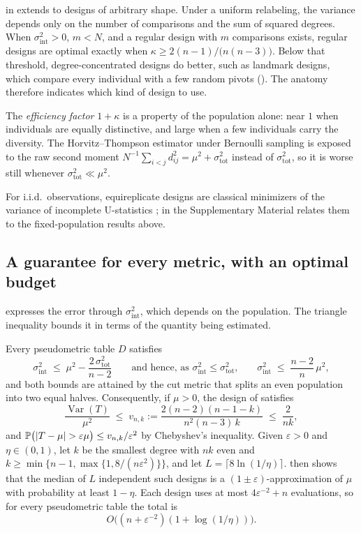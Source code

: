 \documentclass[twoside,11pt]{article}
\newcommand{\Prob}{\mathbb{P}}
\DeclareMathOperator{\Var}{Var}
\DeclarePairedDelimiter{\abs}{\lvert}{\rvert}
\newcommand{\sigmaint}{\sigma^2_{\mathrm{int}}}
\newcommand{\sigmatot}{\sigma^2_{\mathrm{tot}}}
\begin{document}
 in  extends
 to designs of arbitrary shape. Under a uniform
relabeling, the variance depends only on the number of comparisons and the
sum of squared degrees. When $\sigmaint>0$, $m<N$, and a regular design with $m$
comparisons exists, regular designs are optimal exactly when
$\kappa\ge 2(n-1)/\bigl(n(n-3)\bigr)$. Below that threshold, degree-concentrated
designs do better, such as landmark designs, which compare every individual
with a few random pivots (). The anatomy therefore indicates
which kind of design to use.

The \emph{efficiency factor} $1+\kappa$ is a property of the population alone:
near $1$ when individuals are equally distinctive, and large when a few
individuals carry the diversity. The Horvitz--Thompson estimator under
Bernoulli sampling is exposed to the raw second moment
${N^{-1}\sum_{i<j}d_{ij}^2=\mu^2+\sigmatot}$ instead of $\sigmatot$, so it
is worse still whenever $\sigmatot\ll\mu^2$.

For i.i.d.\ observations, equireplicate designs are classical minimizers of
the variance of incomplete U-statistics
\citep{blom1976some,brown1978reduced,lee1982incomplete,lee1990ustatistics};
 in the Supplementary Material relates them to the
fixed-population results above.

\subsection{A guarantee for every metric, with an optimal budget}
\label{sec:metric}

 expresses the error through $\sigmaint$, which depends
on the population. The triangle inequality bounds it in terms of the
quantity being estimated.

\begin{theorem}
\label{thm:metric}
Every pseudometric table $D$ satisfies
\[
\sigmaint\;\le\;\mu^2-\frac{2\,\sigmatot}{n-2}
\qquad\text{and hence, as $\sigmaint\le\sigmatot$,}\qquad
\sigmaint\;\le\;\frac{n-2}{n}\,\mu^2 ,
\]
and both bounds are attained by the cut metric that splits an even
population into two equal halves. Consequently, if $\mu>0$, the design of
 satisfies
\[
\frac{\Var(T)}{\mu^2}\;\le\; v_{n,k}:=\frac{2(n-2)(n-1-k)}{n^2(n-3)\,k}\;\le\;\frac{2}{nk},
\]
and $\Prob\big(\abs{T-\mu}>\varepsilon\mu\big)\le v_{n,k}/\varepsilon^2$ by Chebyshev's
inequality.
Given $\varepsilon>0$ and $\eta\in(0,1)$, let $k$ be the smallest degree with $nk$ even and
$k\ge\min\{n-1,\max\{1,8/(n\varepsilon^2)\}\}$, and let
${L=\lceil 8\ln(1/\eta)\rceil}$.  then shows that the
median of $L$ independent such designs is a
$(1\pm\varepsilon)$-approximation of $\mu$ with probability at least
${1-\eta}$. Each design uses at most $4\varepsilon^{-2}+n$ evaluations, so
for every pseudometric table the total is
\[
O\big((n+\varepsilon^{-2})(1+\log(1/\eta))\big).
\]
\end{theorem}
\end{document}
